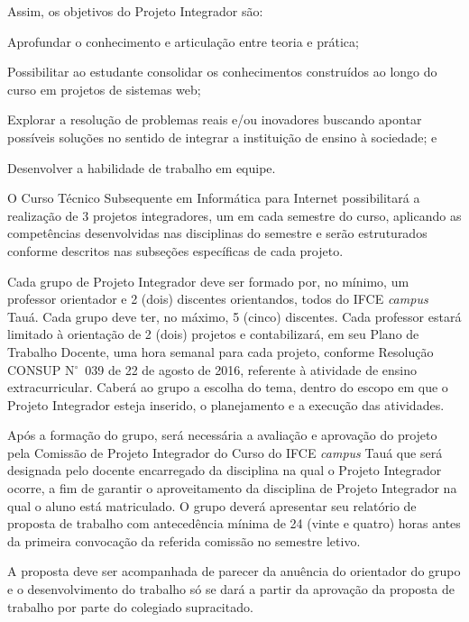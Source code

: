 \documentclass[
	12pt,				%
	openright,			%
	twoside,			%
	a4paper,			%
	chapter=TITLE,		%
	english,			%
	french,				%
	spanish,			%
	brazil,				%
	]{abntex2}
\newcommand{\n}{N$^\circ$}
\begin{document}
Assim, os objetivos do Projeto Integrador são:
\begin{alineas}
\item Aprofundar o conhecimento e articulação entre teoria e prática;
\item  Possibilitar ao estudante consolidar os conhecimentos construídos ao longo
do curso em projetos de sistemas web;
\item  Explorar a resolução de problemas reais e/ou inovadores buscando apontar possíveis soluções no sentido de integrar a instituição de ensino à sociedade; e
\item Desenvolver a habilidade de trabalho em equipe.

\end{alineas}

O Curso Técnico Subsequente em Informática para Internet possibilitará a realização de 3 projetos integradores,  um em cada semestre do curso, aplicando as competências desenvolvidas nas disciplinas do semestre e serão estruturados conforme  descritos  nas subseções específicas de cada projeto.


Cada grupo de Projeto Integrador deve ser formado por, no mínimo, um professor orientador e 2 (dois) discentes orientandos, todos do IFCE \textit{campus} Tauá. Cada grupo deve ter, no máximo, 5 (cinco) discentes. Cada professor estará limitado à orientação de 2 (dois) projetos e contabilizará, em seu Plano de Trabalho Docente, uma hora semanal para cada projeto, conforme Resolução CONSUP \n~039 de 22 de agosto de 2016, referente à atividade de ensino extracurricular. Caberá ao grupo a escolha do tema, dentro do escopo em que o Projeto Integrador esteja inserido, o planejamento e a execução das atividades.

Após a formação do grupo, será necessária a avaliação e aprovação do projeto pela Comissão de Projeto Integrador do Curso do IFCE \textit{campus} Tauá que será designada pelo docente encarregado da disciplina na qual o Projeto Integrador ocorre, a fim de garantir o aproveitamento da disciplina de Projeto Integrador na qual o aluno está matriculado. O grupo deverá apresentar seu relatório de proposta de trabalho com antecedência mínima de 24 (vinte e quatro) horas antes da primeira convocação da referida comissão no semestre letivo. 

A proposta deve ser acompanhada de parecer da anuência do orientador do grupo e o desenvolvimento do trabalho só se dará a partir da aprovação da proposta de trabalho por parte do colegiado supracitado.
\end{document}
